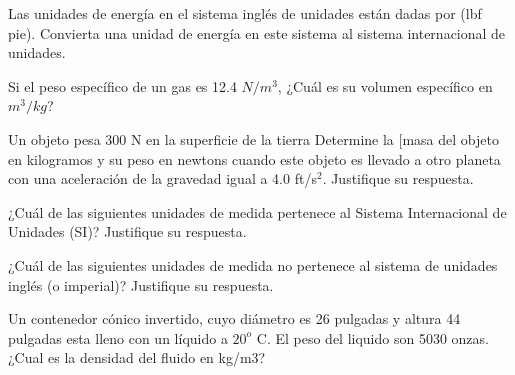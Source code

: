 \documentclass[12pt, a4paper]{exam}
\begin{document}
\begin{questions}

    \question Las unidades de energía en el sistema inglés de unidades están dadas por (lbf pie). Convierta una unidad de energía en este sistema al sistema internacional de unidades.

	\question Si el peso específico de un gas es 12.4 $N/m^3$, ¿Cuál es su volumen específico en $m^3/kg$?
		
   \question

    Un objeto pesa 300 N en la superficie de la tierra Determine la [masa del objeto en kilogramos y su peso en newtons cuando este objeto es llevado a otro planeta con una aceleración de la gravedad igual a 4.0 ft/s$^2$. Justifique su respuesta.
  
    \question ¿Cuál de las siguientes unidades de medida pertenece al Sistema Internacional de Unidades (SI)? Justifique su respuesta. 
    
    
    \question ¿Cuál de las siguientes unidades de medida no pertenece al sistema de unidades inglés (o imperial)? Justifique su respuesta. 
    

    \question Un contenedor cónico invertido, cuyo diámetro es 26 pulgadas y altura 44 pulgadas esta lleno con un líquido a $ 20^{o}$ C. El peso del liquido son 5030 onzas. ¿Cual es la densidad del fluido en kg/m3?


\end{questions}
\end{document}
